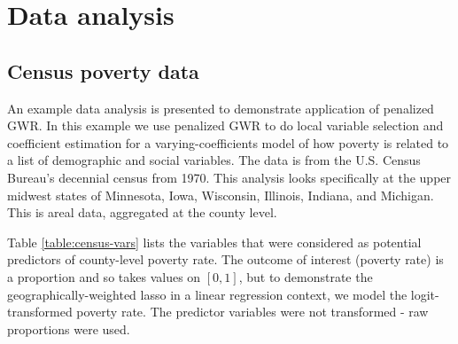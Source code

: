 \documentclass[authoryear, review, 11pt]{elsarticle}
\begin{document}

	


			
\section{Data analysis}
	\subsection{Census poverty data}
	An example data analysis is presented to demonstrate application of penalized GWR. In this example we use penalized GWR to do local variable selection and coefficient estimation for a  varying-coefficients model of how poverty is related to a list of demographic and social variables. The data is from the U.S. Census Bureau's decennial census  from 1970. This analysis looks specifically at the upper midwest states of Minnesota, Iowa, Wisconsin, Illinois, Indiana, and Michigan. This is areal data, aggregated at the county level.
	
	Table \ref{table:census-vars} lists the variables that were considered as potential predictors of county-level poverty rate. The outcome of interest (poverty rate) is a proportion and so takes values on $[0,1]$, but to demonstrate the geographically-weighted lasso in a linear regression context, we model the logit-transformed poverty rate. The predictor variables were not transformed - raw proportions were used.
	
\end{document}
